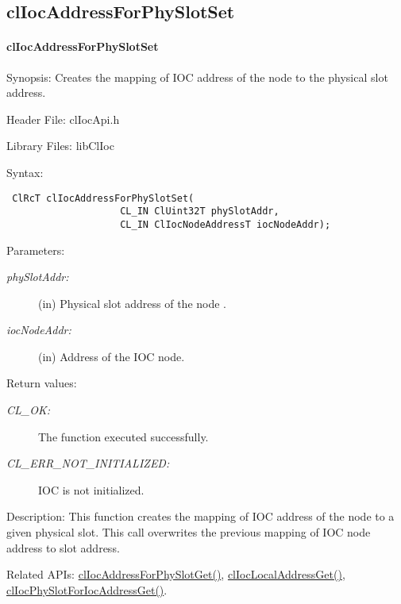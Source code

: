 \begin{flushleft}
\subsection{clIocAddressForPhySlotSet}
\hypertarget{pageIOC129}{}\paragraph{cl\-Ioc\-Address\-For\-Phy\-Slot\-Set}\label{pageIOC129}
\begin{Desc}
\item[Synopsis: ]Creates the mapping of IOC address of the node to the physical slot address.\end{Desc}
\begin{Desc}
\item[Header File:]clIocApi.h\end{Desc}
\begin{Desc}
\item[Library Files:]libClIoc\end{Desc}
\begin{Desc}
\item[Syntax: ]

\footnotesize\begin{verbatim} ClRcT clIocAddressForPhySlotSet( 
                    CL_IN ClUint32T phySlotAddr, 
                    CL_IN ClIocNodeAddressT iocNodeAddr); 
\end{verbatim}
\normalsize
 \end{Desc}
\begin{Desc}
\item[Parameters:]
\begin{description}
\item[{\em phy\-Slot\-Addr:}](in) Physical slot address of the node . 
\item[{\em ioc\-Node\-Addr:}](in) Address of the IOC node.\end{description}
\end{Desc}
\begin{Desc}
\item[Return values:]
\begin{description}
\item[{\em CL\_\-OK:}] The function executed successfully. \item[{\em CL\_\-ERR\_\-NOT\_\-INITIALIZED:}]IOC is not initialized.\end{description}
\end{Desc}
\begin{Desc}
\item[Description: ]This function creates the mapping of IOC address of the node to a given physical slot. This call overwrites the previous mapping of
IOC node address to slot address.\end{Desc}
\begin{Desc}
\item[Related APIs:]\hyperlink{pageIOC128}{clIocAddressForPhySlotGet()}, \hyperlink{pageioc128}
{clIocLocalAddressGet()}, \hyperlink{pageIOC130}{clIocPhySlotForIocAddressGet()}. \end{Desc}
\newpage





\end{flushleft}
